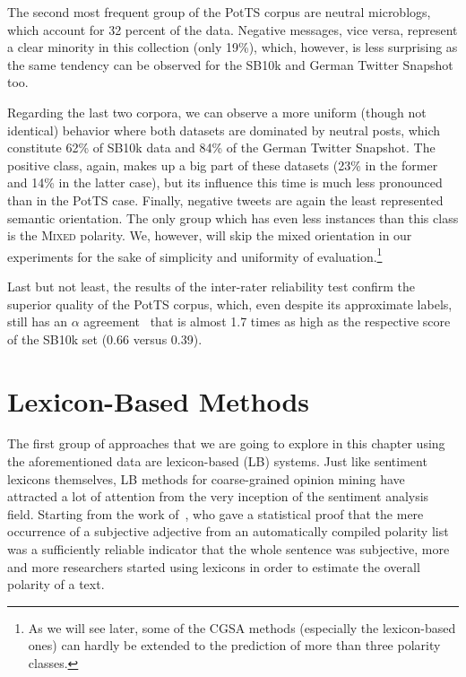 The second most frequent group of the PotTS corpus are neutral
microblogs, which account for 32 percent of the data.  Negative
messages, vice versa, represent a clear minority in this collection
(only 19\%), which, however, is less surprising as the same tendency
can be observed for the SB10k and German Twitter Snapshot too.

Regarding the last two corpora, we can observe a more uniform (though
not identical) behavior where both datasets are dominated by neutral
posts, which constitute 62\% of SB10k data and 84\% of the German
Twitter Snapshot.  The positive class, again, makes up a big part of
these datasets (23\% in the former and 14\% in the latter case), but
its influence this time is much less pronounced than in the PotTS
case.  Finally, negative tweets are again the least represented
semantic orientation.  The only group which has even less instances
than this class is the \textsc{Mixed} polarity.  We, however, will
skip the mixed orientation in our experiments for the sake of
simplicity and uniformity of evaluation.\footnote{As we will see
  later, some of the CGSA methods (especially the lexicon-based ones)
  can hardly be extended to the prediction of more than three polarity
  classes.}

Last but not least, the results of the inter-rater reliability test
confirm the superior quality of the PotTS corpus, which, even despite
its approximate labels, still has an $\alpha$
agreement~\cite{Krippendorff:07} that is almost 1.7 times as high as
the respective score of the SB10k set (0.66 versus 0.39).


\section{Lexicon-Based Methods}\label{sec:cgsa:lexicon-based}

The first group of approaches that we are going to explore in this
chapter using the aforementioned data are lexicon-based (LB) systems.
Just like sentiment lexicons themselves, LB methods for coarse-grained
opinion mining have attracted a lot of attention from the very
inception of the sentiment analysis field.  Starting from the work
of~\citet{Hatzivassi:00}, who gave a statistical proof that the mere
occurrence of a subjective adjective from an automatically compiled
polarity list was a sufficiently reliable indicator that the whole
sentence was subjective, more and more researchers started using
lexicons in order to estimate the overall polarity of a text.

